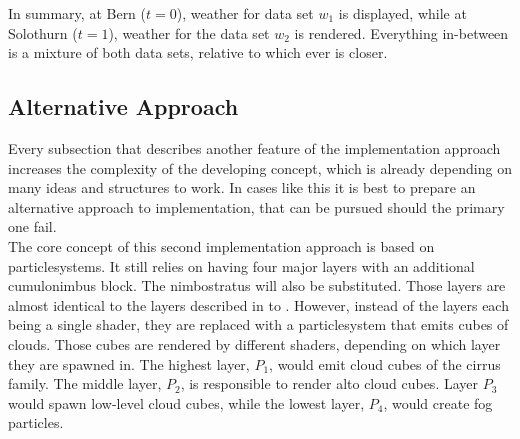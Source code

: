 \noindent
In summary,  at Bern ($t = 0$), weather for data set $w_1$ is displayed, while at Solothurn ($t = 1$), weather for the data set $w_2$ is rendered.
Everything in-between is a mixture of both data sets, relative to which ever is closer.

\pagebreak

\subsection{Alternative Approach}
\label{section:impl:altapproach}
Every subsection that describes another feature of the implementation approach increases the complexity of the developing concept,
which is already depending on many ideas and structures to work.
In cases like this it is best to prepare an alternative approach to implementation, that can be pursued should the primary one fail.
\\
The core concept of this second implementation approach is based on \gls{particlesystem}s.
It still relies on having four major layers with an additional cumulonimbus block. The nimbostratus will also be substituted.
Those layers are almost identical to the layers described in  to .
However, instead of the layers each being a single \gls{shader}, they are replaced with a \gls{particlesystem} that emits cubes of clouds.
Those cubes are rendered by different \gls{shader}s, depending on which layer they are spawned in.
The highest layer, \color{darkercyan}$P_1$\color{black}, would emit cloud cubes of the cirrus family.
The middle layer, \color{darkercyan}$P_2$\color{black}, is responsible to render alto cloud cubes.
Layer \color{darkercyan}$P_3$ \color{black} would spawn low-level cloud cubes, while the lowest layer, \color{darkercyan}$P_4$\color{black}, would create fog particles.

